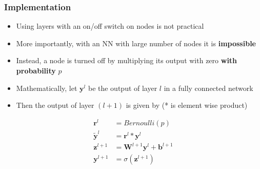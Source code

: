 \documentclass{beamer}
\begin{document}
\begin{frame}
    \frametitle{Implementation}
\begin{itemize}
    \item Using layers with an on/off switch on nodes is not practical 
    \item More importantly, with an NN with large number of nodes it is \textbf{impossible}
    \item Instead, a node is turned off by multiplying its output with zero \textbf{with probability} $p$ 
    \item Mathematically, let $\mathbf{y}^{l}$ be the output of layer $l$ in a fully connected network
    \item Then the output of layer $(l+1)$ is given by  (* is element wise product)
\end{itemize}
    \begin{align*}
       \mathbf{r}^l&=Bernoulli(p)\\
        \mathbf{\tilde{y}}^l&=\mathbf{r}^l*\mathbf{y}^l\\
        \mathbf{z}^{l+1}&=\mathbf{W}^{l+1}\mathbf{y}^l+\mathbf{b}^{l+1}\\
        \mathbf{y}^{l+1}&=\sigma(\mathbf{z}^{l+1})
    \end{align*}

\end{frame}
\end{document}
